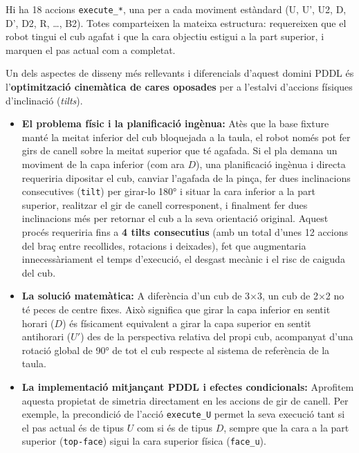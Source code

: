 \documentclass[12pt, a4paper]{article}
\begin{document}
Hi ha 18 accions \texttt{execute\_*}, una per a cada moviment estàndard (U, U', U2, D, D', D2, R, \ldots, B2). Totes comparteixen la mateixa estructura: requereixen que el robot tingui el cub agafat i que la cara objectiu estigui a la part superior, i marquen el pas actual com a completat.

Un dels aspectes de disseny més rellevants i diferencials d'aquest domini PDDL és l'\textbf{optimització cinemàtica de cares oposades} per a l'estalvi d'accions físiques d'inclinació (\textit{tilts}).

\begin{itemize}[leftmargin=1.5em]
  \item \textbf{El problema físic i la planificació ingènua:} Atès que la base fixture manté la meitat inferior del cub bloquejada a la taula, el robot només pot fer girs de canell sobre la meitat superior que té agafada. Si el pla demana un moviment de la capa inferior (com ara $D$), una planificació ingènua i directa requeriria dipositar el cub, canviar l'agafada de la pinça, fer dues inclinacions consecutives (\texttt{tilt}) per girar-lo 180° i situar la cara inferior a la part superior, realitzar el gir de canell corresponent, i finalment fer dues inclinacions més per retornar el cub a la seva orientació original. Aquest procés requeriria fins a \textbf{4 tilts consecutius} (amb un total d'unes 12 accions del braç entre recollides, rotacions i deixades), fet que augmentaria innecessàriament el temps d'execució, el desgast mecànic i el risc de caiguda del cub.
  
  \item \textbf{La solució matemàtica:} A diferència d'un cub de 3$\times$3, un cub de 2$\times$2 no té peces de centre fixes. Això significa que girar la capa inferior en sentit horari ($D$) és físicament equivalent a girar la capa superior en sentit antihorari ($U'$) des de la perspectiva relativa del propi cub, acompanyat d'una rotació global de 90° de tot el cub respecte al sistema de referència de la taula.
  
  \item \textbf{La implementació mitjançant PDDL i efectes condicionals:} Aprofitem aquesta propietat de simetria directament en les accions de gir de canell. Per exemple, la precondició de l'acció \texttt{execute\_U} permet la seva execució tant si el pas actual és de tipus $U$ com si és de tipus $D$, sempre que la cara a la part superior (\texttt{top-face}) sigui la cara superior física (\texttt{face\_u}). 
  

\end{itemize}
\end{document}
